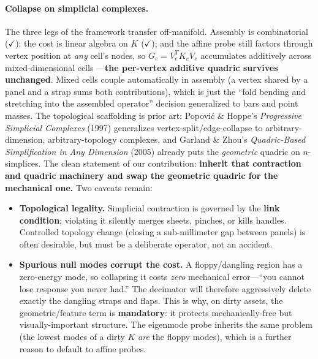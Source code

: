 \paragraph{Collapse on simplicial complexes.}
The three legs of the framework transfer off-manifold.
Assembly is combinatorial ($\checkmark$); the cost is linear algebra on $K$ ($\checkmark$); and the affine probe still factors through vertex position at \emph{any} cell's nodes, so $G_e = V_e^T K_e V_e$ accumulates additively across mixed-dimensional cells ---\textbf{the per-vertex additive quadric survives unchanged}.
Mixed cells couple automatically in assembly (a vertex shared by a panel and a strap sums both contributions), which is just the ``fold bending and stretching into the assembled operator'' decision generalized to bars and point masses.
The topological scaffolding is prior art: Popovi\'c \& Hoppe's \emph{Progressive Simplicial Complexes} (1997) generalizes vertex-split/edge-collapse to arbitrary-dimension, arbitrary-topology complexes, and Garland \& Zhou's \emph{Quadric-Based Simplification in Any Dimension} (2005) already puts the \emph{geometric} quadric on $n$-simplices.
The clean statement of our contribution: \textbf{inherit that contraction and quadric machinery and swap the geometric quadric for the mechanical one.}
Two caveats remain:
\begin{itemize}
  \item \textbf{Topological legality.}
        Simplicial contraction is governed by the \textbf{link condition}; violating it silently merges sheets, pinches, or kills handles.
        Controlled topology change (closing a sub-millimeter gap between panels) is often desirable, but must be a deliberate operator, not an accident.
  \item \textbf{Spurious null modes corrupt the cost.}
        A floppy/dangling region has a zero-energy mode, so collapsing it costs \emph{zero} mechanical error---``you cannot lose response you never had.''
        The decimator will therefore aggressively delete exactly the dangling straps and flaps.
        This is why, on dirty assets, the geometric/feature term is \textbf{mandatory}: it protects mechanically-free but visually-important structure.
        The eigenmode probe inherits the same problem (the lowest modes of a dirty $K$ \emph{are} the floppy modes), which is a further reason to default to affine probes.
\end{itemize}

